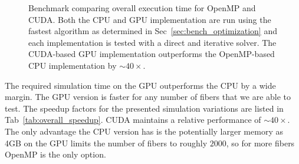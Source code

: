 \begin{figure}[!htbp]
  \centering
  \caption[Benchmark overall execution time.]{Benchmark comparing overall execution time for OpenMP and CUDA. Both the CPU and GPU implementation are run using the fastest algorithm as determined in Sec~\ref{sec:bench_optimization} and each implementation is tested with a direct and iterative solver. The CUDA-based GPU implementation outperforms the OpenMP-based CPU implementation by ${\sim}40×$.}
  \label{fig:overall}
\end{figure}

The required simulation time on the GPU outperforms the CPU by a wide margin. The GPU version is faster for any number of fibers that we are able to test. The speedup factors for the presented simulation variations are listed in Tab~\ref{tab:overall_speedup}. CUDA maintains a relative performance of ${\sim}40×$. The only advantage the CPU version has is the potentially larger memory as 4GB on the GPU limits the number of fibers to roughly $2000$, so for more fibers OpenMP is the only option.

